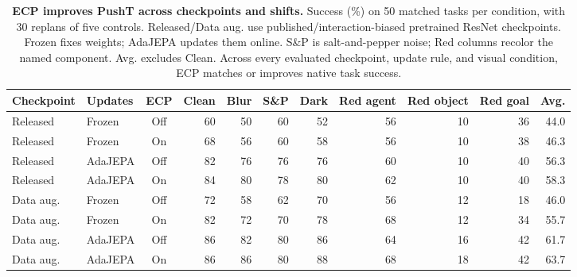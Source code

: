 \begin{table}[t]
\centering
\caption{\textbf{ECP improves PushT across checkpoints and shifts.} Success (\%) on 50 matched tasks per condition, with 30 replans of five controls. Released/Data aug. use published/interaction-biased pretrained ResNet checkpoints. Frozen fixes weights; AdaJEPA updates them online. S\&P is salt-and-pepper noise; Red columns recolor the named component. Avg. excludes Clean. Across every evaluated checkpoint, update rule, and visual condition, ECP matches or improves native task success.}
\label{tab:pusht-ecp}
\small
\setlength{\tabcolsep}{3.7pt}
\begin{tabular*}{\textwidth}{@{\extracolsep{\fill}}llcrrrrrrrr@{}}
\toprule
Checkpoint & Updates & ECP & Clean & Blur & S\&P & Dark & Red agent & Red object & Red goal & Avg.\\
\midrule
Released & Frozen & Off & 60 & 50 & 60 & 52 & 56 & 10 & 36 & 44.0\\
Released & Frozen & On & 68 & 56 & 60 & 58 & 56 & 10 & 38 & 46.3\\
Released & AdaJEPA & Off & 82 & 76 & 76 & 76 & 60 & 10 & 40 & 56.3\\
Released & AdaJEPA & On & 84 & 80 & 78 & 80 & 62 & 10 & 40 & 58.3\\
\midrule
Data aug. & Frozen & Off & 72 & 58 & 62 & 70 & 56 & 12 & 18 & 46.0\\
Data aug. & Frozen & On & 82 & 72 & 70 & 78 & 68 & 12 & 34 & 55.7\\
Data aug. & AdaJEPA & Off & 86 & 82 & 80 & 86 & 64 & 16 & 42 & 61.7\\
Data aug. & AdaJEPA & On & 86 & 86 & 80 & 88 & 68 & 18 & 42 & 63.7\\
\bottomrule
\end{tabular*}
\end{table}
